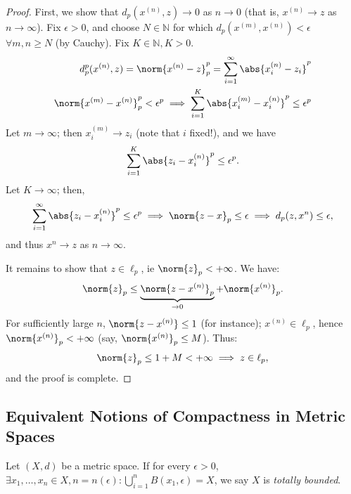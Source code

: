 \begin{proof}
    First, we show that $d_p(x^{(n)}, z) \to 0$ as $n \to 0$ (that is, $x^{(n)} \to z$ as $n \to \infty$). Fix $\epsilon >0$, and choose $N \in \mathbb{N}$ for which $d_p(x^{(m)}, x^{(n)} )< \epsilon$ $\forall m, n \geq N$ (by Cauchy). Fix $K \in \mathbb{N}, K > 0$.
    \begin{align*}
        d_p^p(x^{(n)}, z) = \norm{x^{(n)} - z}_p^p = \sum_{i=1}^\infty \abs{x_i^{(n)} - z_i}^{p}\\
        \norm{x^{(m)} - x^{(n)}}_p^p < \epsilon^p \implies \sum_{i=1}^K\abs{x_i^{(m)} - x_i^{(n)}}^p \leq \epsilon^p
    \end{align*}
    Let $m \to \infty$; then $x_i^{(m)} \to z_i$ (note that $i$ fixed!), and we have \begin{align*}
        \sum_{i=1}^K\abs{z_i - x_i^{(n)}}^p \leq \epsilon^p.
    \end{align*}
    Let $K \to \infty$; then, 
    \begin{align*}
        \sum_{i=1}^\infty \abs{z_i - x_i^{(n)}}^p \leq \epsilon^p\implies \norm{z - x}_p \leq \epsilon\implies d_p(z, x^{n}) \leq \epsilon,
    \end{align*}
    and thus $x^{n} \to z$ as $n \to \infty$. 

    It remains to show that $z \in \ell_p$, ie $\norm{z}_p < + \infty$. We have:
    \begin{align*}
        \norm{z}_p \leq \underbrace{\norm{z - x^{(n)}}_p}_{\to 0} + \norm{x^{(n)}}_p.
    \end{align*}
    For sufficiently large $n$, $\norm{z - x^{(n)}} \leq 1$ (for instance); $x^{(n)} \in \ell_p$, hence $\norm{x^{(n)}}_p < + \infty$ (say, $\norm{x^{(n)}}_p \leq M$). Thus:\begin{align*}
        \norm{z}_p \leq 1 + M < + \infty \implies z \in \ell_p,
    \end{align*}
    and the proof is complete.
\end{proof}

\subsection{Equivalent Notions of Compactness in Metric Spaces}
\begin{definition}
    Let $(X,d)$ be a metric space. If for every $\epsilon > 0$, $\exists x_1, \dots, x_n \in X, n = n(\epsilon) : \bigcup_{i=1}^n B(x_1, \epsilon) = X$, we say $X$ is \emph{totally bounded}.
\end{definition}
